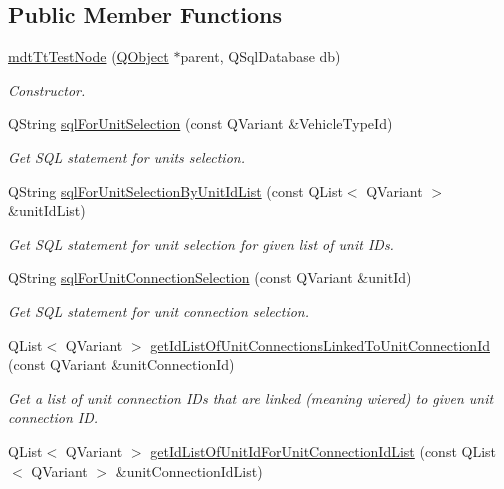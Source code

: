 \subsection*{Public Member Functions}
\begin{DoxyCompactItemize}
\item 
\hyperlink{classmdt_tt_test_node_a6a3513f05c9d76f60d7a27bd26c5ecc3}{mdt\-Tt\-Test\-Node} (\hyperlink{class_q_object}{Q\-Object} $\ast$parent, Q\-Sql\-Database db)
\begin{DoxyCompactList}\small\item\em Constructor. \end{DoxyCompactList}\item 
Q\-String \hyperlink{classmdt_tt_test_node_ae1c4ba44984fb21ec36aa4aa15207ad4}{sql\-For\-Unit\-Selection} (const Q\-Variant \&Vehicle\-Type\-Id)
\begin{DoxyCompactList}\small\item\em Get S\-Q\-L statement for units selection. \end{DoxyCompactList}\item 
Q\-String \hyperlink{classmdt_tt_test_node_a98245190a8c199d1a7238b2d1c557830}{sql\-For\-Unit\-Selection\-By\-Unit\-Id\-List} (const Q\-List$<$ Q\-Variant $>$ \&unit\-Id\-List)
\begin{DoxyCompactList}\small\item\em Get S\-Q\-L statement for unit selection for given list of unit I\-Ds. \end{DoxyCompactList}\item 
Q\-String \hyperlink{classmdt_tt_test_node_a0dcbf96a31c631f8ce62e1526688ba9f}{sql\-For\-Unit\-Connection\-Selection} (const Q\-Variant \&unit\-Id)
\begin{DoxyCompactList}\small\item\em Get S\-Q\-L statement for unit connection selection. \end{DoxyCompactList}\item 
Q\-List$<$ Q\-Variant $>$ \hyperlink{classmdt_tt_test_node_a3a0e95628454016a49202dfb7a40e871}{get\-Id\-List\-Of\-Unit\-Connections\-Linked\-To\-Unit\-Connection\-Id} (const Q\-Variant \&unit\-Connection\-Id)
\begin{DoxyCompactList}\small\item\em Get a list of unit connection I\-Ds that are linked (meaning wiered) to given unit connection I\-D. \end{DoxyCompactList}\item 
Q\-List$<$ Q\-Variant $>$ \hyperlink{classmdt_tt_test_node_a6e72542d6a7e1773cc228d9cfc9f3be8}{get\-Id\-List\-Of\-Unit\-Id\-For\-Unit\-Connection\-Id\-List} (const Q\-List$<$ Q\-Variant $>$ \&unit\-Connection\-Id\-List)

\end{DoxyCompactItemize}
